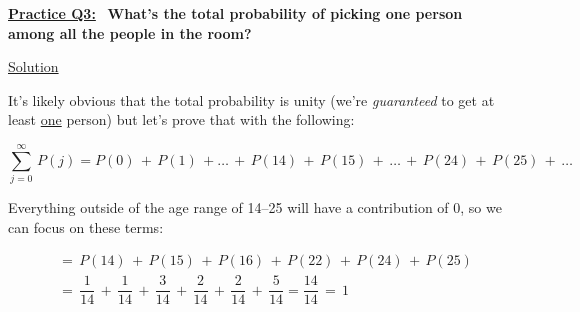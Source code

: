 

\underline{\textbf{Practice Q3:}} \ \textbf{What's the total probability of
picking one person among all the people in the room?}

\bigskip

\underline{Solution}

It's likely obvious that the total probability is unity (we're
\textit{guaranteed} to get at least \underline{one} person) but let's prove
that with the following:

\[
    \sum_{j=0}^{\infty} \, P(j) = P(0) \, + \, P(1) \, + \dots \, + \, P(14) \,
    + \, P(15) \, + \, \dots \, + \, P(24) \, + \, P(25) \, + \, \dots
\]

Everything outside of the age range of 14--25 will have a contribution of 0,
so we can focus on these terms:

\begin{align*}
    &= \, P(14) \, + \, P(15) \, + \, P(16) \, + \, P(22) \, + \, P(24) \, + \,
    P(25) \\[1.5ex]
    &= \, \dfrac{1}{14} \, + \, \dfrac{1}{14} \, + \, \dfrac{3}{14} \, + \,
    \dfrac{2}{14} \, + \, \dfrac{2}{14} \, + \, \dfrac{5}{14} = \dfrac{14}{14}
    \, = \, \boxed{1}
\end{align*}